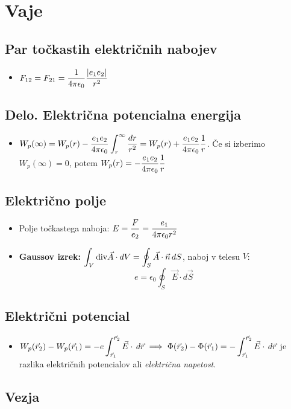 \section{Vaje}
\subsection{Par točkastih električnih nabojev}
\begin{itemize}
    \item \(\displaystyle F_{12}=F_{21} = \frac{1}{4 \pi \epsilon_0} \frac{|e_1e_2|}{r^2}\)
\end{itemize}
\subsection{Delo. Električna potencialna energija}
\begin{itemize}
    \item \(\displaystyle W_p(\infty) = W_p(r) -  \frac{e_1 e_2}{4 \pi \epsilon_0} \int_{r}^{\infty} \frac{dr}{r^2} = W_p(r) + \frac{e_1e_2}{4\pi \epsilon_0} \frac{1}{r}\). Če si izberimo \(W_p(\infty) = 0\), potem \(\displaystyle W_p(r) = -  \frac{e_1e_2}{4\pi \epsilon_0} \frac{1}{r}\)
\end{itemize}
\subsection{Električno polje}
\begin{itemize}
    \item Polje točkastega naboja: \(\displaystyle E = \frac{F}{e_2} = \frac{e_1}{4 \pi \epsilon_0 r^2}\)
    \item \textbf{Gaussov izrek:} \(\displaystyle \int_{V} \text{div} \vec{A} \cdot dV = \oint_S \vec{A} \cdot \vec{n} \, dS\), naboj v telesu \(V\): \[e = \epsilon_0 \oint_S \vec{E} \cdot d \vec{S}\]
\end{itemize}
\subsection{Električni potencial}
\begin{itemize}
    \item \(\displaystyle W_p(\vec{r}_2)- W_p(\vec{r}_1) = -e \int_{\vec{r}_1}^{\vec{r}_2} \vec{E} \cdot \, d \vec{r} \implies \Phi(\vec{r}_2) - \Phi(\vec{r}_1) = - \int_{\vec{r}_1}^{\vec{r}_2} \vec{E} \cdot \, d \vec{r} \) je razlika električnih potencialov ali \emph{električna napetost}.
\end{itemize}

\subsection{Vezja}
